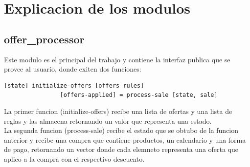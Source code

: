 \documentclass[a4paper, 12pt]{article}
\begin{document}
	\section{Explicacion de los modulos}
		\subsection{offer\_processor}
			Este modulo es el principal del trabajo y contiene la interfaz publica que se provee al usuario, donde exiten dos 				funciones:\\
			\begin{lstlisting}[frame=tb, caption=firmas de la interfaz publica, label=zebra, tabsize=1]
				[state] initialize-offers [offers rules]
				[offers-applied] = process-sale [state, sale]
			\end{lstlisting}
			La primer funcion (initialize-offers) recibe una lista de ofertas y una lista de reglas y las almacena retornando un 				valor que representa una estado. \\
			La segunda funcion (process-sale) recibe el estado que se obtubo de la funcion anterior y recibe una compra que 			contiene productos, un calendario y una forma de pago, retornando un vector donde cada elemneto representa una oferta 				que aplico a la compra con el respectivo descuento.
		
		\newpage
\end{document}
